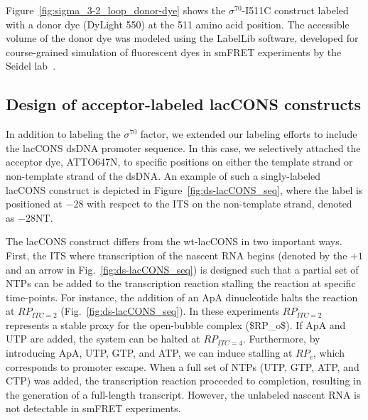 Figure~\ref{fig:sigma_3-2_loop_donor-dye} shows the $\sigma^{70}$-I511C construct labeled with a donor dye (DyLight 550) at the 511 amino acid position. 
The accessible volume of the donor dye was modeled using the LabelLib software, developed for course-grained simulation of fluorescent dyes in \ac{smFRET} experiments by the Seidel lab~\cite{dimura_NatComm_2020}.


\subsection{Design of acceptor-labeled \ac{lacCONS} constructs}
\label{sec:dsDNA_lib_exp}

In addition to labeling the $\sigma^{70}$ factor, we extended our labeling efforts to include the \ac{lacCONS} \ac{dsDNA} promoter sequence. 
In this case, we selectively attached the acceptor dye, ATTO647N, to specific positions on either the template strand or non-template strand of the \ac{dsDNA}.
An example of such a singly-labeled \ac{lacCONS} construct is depicted in Figure~\ref{fig:ds-lacCONS_seq}, where the label is positioned at $-28$ with respect to the \ac{ITS} on the non-template strand, denoted as $-28$NT.

The \ac{lacCONS} construct differs from the wt-\ac{lacCONS} in two important ways.
First, the \ac{ITS} where transcription of the nascent RNA begins (denoted by the $+1$ and an arrow in Fig.~\ref{fig:ds-lacCONS_seq}) is designed such that a partial set of \ac{NTP}s can be added to the transcription reaction stalling the reaction at specific time-points.
For instance, the addition of an ApA dinucleotide halts the reaction at $RP_{ITC=2}$ (Fig.~\ref{fig:ds-lacCONS_seq}).
In these experiments $RP_{ITC=2}$ represents a stable proxy for the open-bubble complex (\ac{$RP_o$}). 
If ApA and UTP are added, the system can be halted at $RP_{ITC=4}$. 
Furthermore, by introducing ApA, UTP, GTP, and ATP, we can induce stalling at $RP_e$, which corresponds to promoter escape. 
When a full set of \ac{NTP}s (UTP, GTP, ATP, and CTP) was added, the transcription reaction proceeded to completion, resulting in the generation of a full-length transcript.
However, the unlabeled nascent RNA is not detectable in \ac{smFRET} experiments. 

